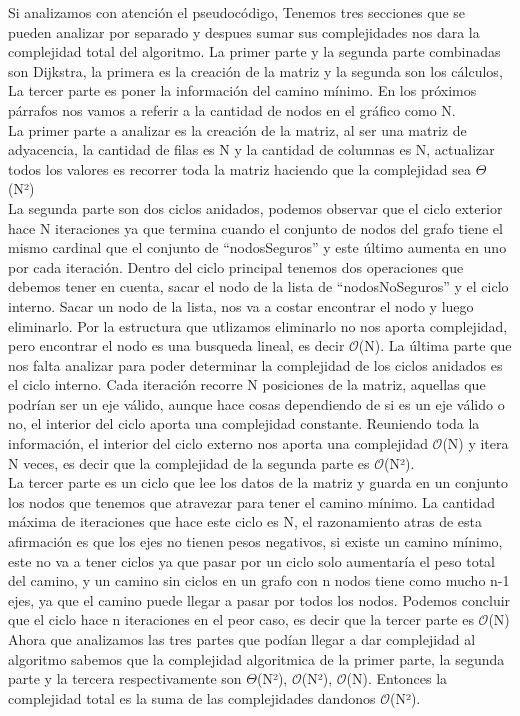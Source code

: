 \documentclass[spanish,12pt]{article}
\begin{document}
Si analizamos con atención el pseudocódigo, Tenemos tres secciones que se pueden analizar por separado y despues sumar sus complejidades nos dara la complejidad total del algoritmo. La primer parte y la segunda parte combinadas son Dijkstra, la primera es la creación de la matriz y la segunda son los cálculos, La tercer parte es poner la información del camino mínimo. En los próximos párrafos nos vamos a referir a la cantidad de nodos en el gráfico como N. 
\\
	 La primer parte a analizar es la creación de la matriz, al ser una matriz de adyacencia, la cantidad de filas es N y la cantidad de columnas es N, actualizar todos los valores es recorrer toda la matriz haciendo que la complejidad sea $\Theta$(N²)
\\
	La segunda parte son dos ciclos anidados, podemos observar que el ciclo exterior hace N iteraciones ya que termina cuando el conjunto de nodos del grafo tiene el mismo cardinal que el conjunto de ``nodosSeguros'' y este último aumenta en uno por cada iteración. Dentro del ciclo principal tenemos dos operaciones que debemos tener en cuenta, sacar el nodo de la lista de ``nodosNoSeguros'' y el ciclo interno. Sacar un nodo de la lista, nos va a costar encontrar el nodo y luego eliminarlo. Por la estructura que utlizamos eliminarlo no nos aporta complejidad, pero encontrar el nodo es una busqueda lineal, es decir $\mathcal{O}$(N). La última parte que nos falta analizar para poder determinar la complejidad de los ciclos anidados es el ciclo interno. Cada iteración recorre N posiciones de la matriz, aquellas que podrían ser un eje válido, aunque hace cosas dependiendo de si es un eje válido o no, el interior del ciclo aporta una complejidad constante. Reuniendo toda la información, el interior del ciclo externo nos aporta una complejidad $\mathcal{O}$(N) y itera N veces, es decir que la complejidad de la segunda parte es $\mathcal{O}$(N²).
\\
	 La tercer parte es un ciclo que lee los datos de la matriz y guarda en un conjunto los nodos que tenemos que atravezar para tener el camino mínimo. La cantidad máxima de iteraciones que hace este ciclo es N, el razonamiento atras de esta afirmación es que los ejes no tienen pesos negativos, si existe un camino mínimo, este no va a tener ciclos ya que pasar por un ciclo solo aumentaría el peso total del camino, y un camino sin ciclos en un grafo con n nodos tiene como mucho n-1 ejes, ya que el camino puede llegar a pasar por todos los nodos. Podemos concluir que el ciclo hace n iteraciones en el peor caso, es decir que la tercer parte es $\mathcal{O}$(N)
\\
\tab Ahora que analizamos las tres partes que podían llegar a dar complejidad al algoritmo sabemos que la complejidad algoritmica de la primer parte, la segunda parte y la tercera respectivamente son $\Theta$(N²), $\mathcal{O}$(N²), $\mathcal{O}$(N). Entonces la complejidad total es la suma de las complejidades dandonos $\mathcal{O}$(N²).
\end{document}
